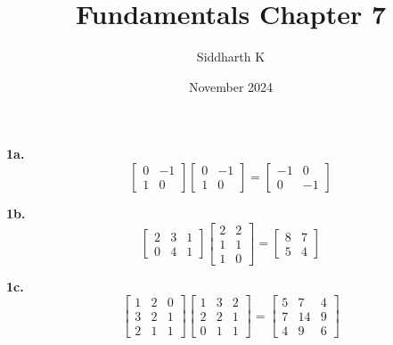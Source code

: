 \documentclass{article}
\title{Fundamentals Chapter 7}
\author{Siddharth K}
\date{November 2024}
\begin{document}
\maketitle

\textbf{1a.} $$\begin{bmatrix}
    0 & -1 \\
    1 & 0
\end{bmatrix}
\begin{bmatrix}
    0 & -1 \\
    1 & 0
\end{bmatrix} = 
\begin{bmatrix}
    -1 & 0 \\
    0 & -1
\end{bmatrix}$$

\textbf{1b.} $$\begin{bmatrix}
    2 & 3 & 1 \\
    0 & 4 & 1
\end{bmatrix}
\begin{bmatrix}
    2 & 2 \\
    1 & 1 \\
    1 & 0
\end{bmatrix} = 
\begin{bmatrix}
    8 & 7 \\
    5 & 4
\end{bmatrix}$$

\textbf{1c.} $$\begin{bmatrix}
    1 & 2 & 0 \\
    3 & 2 & 1 \\
    2 & 1 & 1
\end{bmatrix}
\begin{bmatrix}
    1 & 3 & 2 \\
    2 & 2 & 1 \\
    0 & 1 & 1
\end{bmatrix} = 
\begin{bmatrix}
    5 & 7 & 4 \\
    7 & 14 & 9 \\
    4 & 9 & 6
\end{bmatrix}$$
\end{document}
